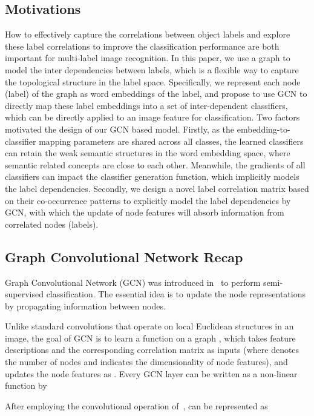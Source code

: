 \documentclass[10pt,twocolumn,letterpaper]{article}
\begin{document}
\subsection{Motivations}\label{sec:motivation}

How to effectively capture the correlations between object labels and explore these label correlations to improve the classification performance are both important for multi-label image recognition. In this paper, we use a graph to model the inter dependencies between labels, which is a flexible way to capture the topological structure in the label space. Specifically, we represent each node (label) of the graph as word embeddings of the label, and propose to use GCN to directly map these label embeddings into a set of inter-dependent classifiers, which can be directly applied to an image feature for classification. Two factors motivated the design of our GCN based model. Firstly, as the embedding-to-classifier mapping parameters are shared across all classes, the learned classifiers can retain the weak semantic structures in the word embedding space, where semantic related concepts are close to each other. Meanwhile, the gradients of all classifiers can impact the classifier generation function, which implicitly models the label dependencies. Secondly,  we design a novel label correlation matrix based on their co-occurrence patterns to explicitly model the label dependencies by GCN, with which the update of node features will absorb information from correlated nodes (labels). 



\subsection{Graph Convolutional Network Recap}

Graph Convolutional Network (GCN) was introduced in~\cite{gcn} to perform semi-supervised classification. The essential idea is to update the node representations by propagating information between nodes.

Unlike standard convolutions that operate on local Euclidean structures in an image, the goal of GCN is to learn a function  on a graph , which takes feature descriptions  and the corresponding correlation matrix  as inputs (where  denotes the number of nodes and  indicates the dimensionality of node features), 
and updates the node features as . Every GCN layer can be written as a non-linear function by

After employing the convolutional operation of~\cite{gcn},   can be represented as
\end{document}
